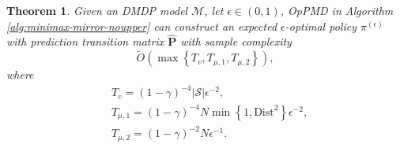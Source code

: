 \documentclass[12pt]{article}
\newtheorem{theorem}{Theorem}
\begin{document}
\begin{theorem}
    Given an DMDP model $\mathcal{M}$, let $\epsilon \in (0,1)$, OpPMD in Algorithm \ref{alg:minimax-mirror-noupper} can construct an expected $\epsilon$-optimal policy $\pi^{(\epsilon)}$ with prediction transition matrix $\hat{\boldsymbol{\text{P}}}$ with sample complexity 
    \begin{equation*}
        \tilde{O} \left (\max\left \{T_{v},T_{\mu,1},T_{\mu,2} \right \} \right),
    \end{equation*}
    where
    \begin{equation*}
        \begin{aligned}
            &T_{v} = (1-\gamma)^{-4} |\mathcal{S}| \epsilon^{-2}, \\
            & T_{\mu,1} = (1-\gamma)^{-4} N \min \left\{1,\text{Dist}^2 \right\} \epsilon^{-2}, \\
            & T_{\mu,2} = (1-\gamma)^{-2} N \epsilon^{-1}.
        \end{aligned}
    \end{equation*}
    \label{thm:sample-complexity-noupper}
\end{theorem}

\end{document}
